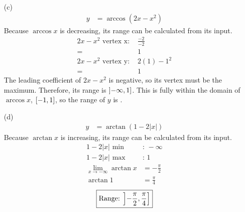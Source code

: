 \documentclass{article}
\begin{document}
\begin{itemize}
\item[(c)]
	\begin{align*}
		y&=\arccos\left(2x-x^2\right)
	\end{align*}
	Because $\arccos x$ is decreasing, its range can be calculated
	from its input.
	\begin{align*}
		\text{$2x-x^2$ vertex x: }&\frac{-2}{-2} \\
		=&1 \\
		\text{$2x-x^2$ vertex y: }&2\left(1\right)-1^2 \\
		=&1
	\end{align*}
	The leading coefficient of $2x-x^2$ is negative, so its vertex
	must be the maximum. Therefore, its range is $\interval[scaled,
	open left]{-\infty}{1}$. This is fully within the domain of
	$\arccos x$, $\interval[scaled]{-1}{1}$, so the range of $y$ is
	.

\item[(d)]
	\begin{align*}
		y&=\arctan\left(1-2|x|\right)
	\end{align*}
	Because $\arctan x$ is increasing, its range can be calculated
	from its input.
	\begin{align*}
		1-2|x|\text{ min}&\text{: }-\infty \\
		1-2|x|\text{ max}&\text{: }1 \\
		\lim_{x\to-\infty}\arctan x&=-\frac{\pi}{2} \\
		\arctan1&=\frac{\pi}{4}
	\end{align*}
	\begin{gather*}
		\boxed{\text{Range: }\interval[scaled,open left]
			{-\frac{\pi}{2}}{\frac{\pi}{4}}}
	\end{gather*}


\end{itemize}
\end{document}
